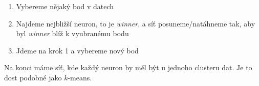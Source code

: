 \documentclass[10pt,a4paper]{article}
\begin{document}
\begin{enumerate}
\item Vybereme nějaký bod v datech
\item Najdeme nejbližší neuron, to je \textit{winner}, a síť posuneme/natáhneme tak, aby byl \textit{winner} blíž k vyubranému bodu
\item Jdeme na krok 1 a vybereme nový bod
\end{enumerate}

\noindent Na konci máme síť, kde každý neuron by měl být u jednoho clusteru dat. Je to dost podobné jako $k$-means.
\end{document}
